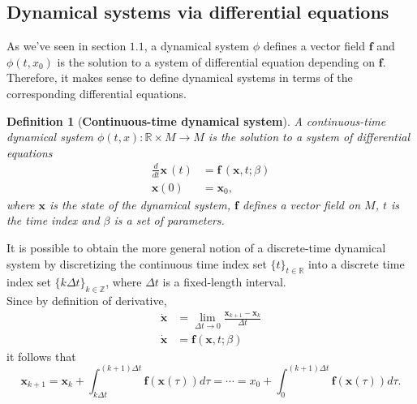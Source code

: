 \documentclass[]{article}
\newtheorem{definition}{Definition}
\begin{document}
\subsection{Dynamical systems via differential equations}
As we've seen in section $1.1$, a dynamical system $\phi$ defines a vector field $\textbf{f}$ and $\phi(t,x_0)$ is the solution to a system of differential equation depending on $\textbf{f}$. Therefore, it makes sense to define dynamical systems in terms of the corresponding differential equations.
\begin{definition}[\textbf{Continuous-time dynamical system}]
A continuous-time dynamical system $\phi(t,x) : \mathbb{R} \times M \to M$ is the solution to a system of differential equations
\begin{equation}
	\begin{split}
		\frac{d}{dt}\textbf{x}\,(t) & = \textbf{f}\,(\textbf{x},t;\beta) \\
		\textbf{x}(0) & = \textbf{x}_0,
	\end{split}
\end{equation}
where $\textbf{x}$ is the state of the dynamical system, $\textbf{f}$ defines a vector field on $M$, $t$ is the time index and $\beta$ is a set of parameters.
\end{definition}
It is possible to obtain the more general notion of a discrete-time dynamical system by discretizing the continuous time index set $\{t\}_{t \in \mathbb{R}}$ into a discrete time index set $\{k\Delta t\}_{k \in \mathbb{Z}}$, where $\Delta t$ is a fixed-length interval. \\
Since by definition of derivative,
\begin{equation}
	\begin{split}
		\dot{\textbf{x}} & = \lim_{\Delta t \to 0}\frac{\textbf{x}_{k+1}-\textbf{x}_k}{\Delta t} \\
		\dot{\textbf{x}} & = \textbf{f}(\textbf{x},t;\beta)
	\end{split}
\end{equation}
it follows that
\begin{equation}
	\textbf{x}_{k+1} = \textbf{x}_k + \int_{k \Delta t}^{(k+1)\Delta t} \textbf{f}(\textbf{x}(\tau)) d\tau = \cdots = x_0+\int_0^{(k+1)\Delta t} \textbf{f}(\textbf{x}(\tau)) d\tau.
\end{equation}
\end{document}
